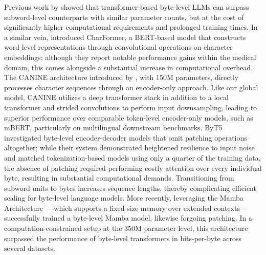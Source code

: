 Previous work by \cite{Choe2019BridgingTG} showed that transformer-based byte-level LLMs can surpass subword-level counterparts with similar parameter counts, but at the cost of significantly higher computational requirements and prolonged training times. In a similar vein, \cite{el2020characterbert} introduced CharFormer, a BERT-based model that constructs word-level representations through convolutional operations on character embeddings; although they report notable performance gains within the medical domain, this comes alongside a substantial increase in computational overhead. The CANINE architecture introduced by \cite{clark2022canine}, with 150M parameters, directly processes character sequences through an encoder-only approach. Like our global model, CANINE utilizes a deep transformer stack in addition to a local transformer and strided convolutions to perform input downsampling, leading to superior performance over comparable token-level encoder-only models, such as mBERT, particularly on multilingual downstream benchmarks. ByT5~\citep{xue2022byt5} investigated byte-level encoder-decoder models that omit patching operations altogether; while their system demonstrated heightened resilience to input noise and matched tokenization-based models using only a quarter of the training data, the absence of patching required performing costly attention over every individual byte, resulting in substantial computational demands. Transitioning from subword units to bytes increases sequence lengths, thereby complicating efficient scaling for byte-level language models. More recently, leveraging the Mamba Architecture~\citep{gu2023mamba}—which supports a fixed-size memory over extended contexts—\cite{wang2024mambabyte} successfully trained a byte-level Mamba model, likewise forgoing patching. In a computation-constrained setup at the 350M parameter level, this architecture surpassed the performance of byte-level transformers in bits-per-byte across several datasets.

